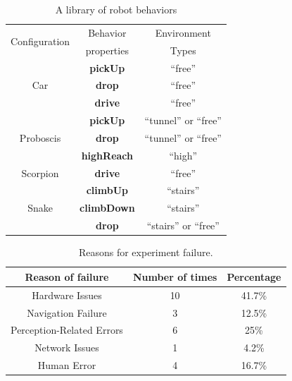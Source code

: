 \documentclass[12pt]{article}
\begin{document}

\begin{table}
\centering
\begin{tabular}{ |c|c|c| } 
 \hline
 \multirow{2}{6em}{Configuration} & Behavior & Environment \\
 & properties & Types \\
 \hline
 \multirow{3}{*}{Car} & \textbf{pickUp} & ``free'' \\\cline{2-3}
  & \textbf{drop} & ``free'' \\\cline{2-3}
  & \textbf{drive} & ``free''\\ \hline
 \multirow{3}{*}{Proboscis} & \textbf{pickUp} & ``tunnel'' or ``free''\\ \cline{2-3}
  & \textbf{drop} &``tunnel'' or ``free'' \\ \cline{2-3}
  & \textbf{highReach} & ``high''\\ \hline
 Scorpion & \textbf{drive} & ``free''\\ \hline
 \multirow{3}{*}{Snake} & \textbf{climbUp} & ``stairs''\\ \cline{2-3}
  & \textbf{climbDown} & ``stairs''\\ \cline{2-3}
  & \textbf{drop} & ``stairs'' or ``free''\\
 \hline
\end{tabular}
\caption{A library of robot behaviors}
\label{table:1}
\end{table}

\begin{table}
\centering
\begin{tabular}{|c|c|c|}
\hline
\textbf{Reason of failure} & \textbf{Number of times} & \textbf{Percentage}\\ 
\hline
Hardware Issues & 10 & 41.7\% \\ 
\hline
Navigation Failure & 3 & 12.5\% \\ 
\hline
Perception-Related Errors & 6 & 25\% \\ 
\hline
Network Issues & 1 & 4.2\% \\ 
\hline
Human Error & 4 & 16.7\% \\ 
\hline
\end{tabular}
\caption{Reasons for experiment failure.}
\label{table:errors}
\end{table}


\end{document}
